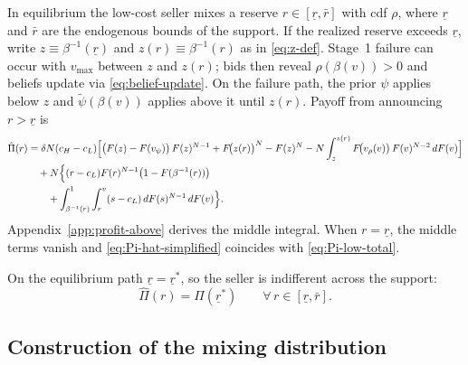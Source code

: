 In equilibrium the low-cost seller mixes a reserve
$r\in[\underline{r},\bar{r}]$ with cdf $\rho$, where $\underline{r}$ and
$\bar{r}$ are the endogenous bounds of the support.
If the realized reserve exceeds $\underline{r}$, write
$z\equiv\beta^{-1}(\underline{r})$ and $z(r)\equiv\beta^{-1}(r)$ as in
\eqref{eq:z-def}.
Stage~1 failure can occur with $v_{\max}$ between $z$ and $z(r)$; bids then
reveal $\rho(\beta(v))>0$ and beliefs update via \eqref{eq:belief-update}.
On the failure path, the prior $\psi$ applies below $z$ and
$\tilde{\psi}(\beta(v))$ applies above it until $z(r)$.
Payoff from announcing $r>\underline{r}$ is
\begin{align}
  \hat{\Pi}(r)
  &= \delta N (c_H - c_L)
    \Bigl[
      \bigl(F(z) - F(v_{\psi})\bigr)\, F(z)^{N-1}
      + F\!\bigl(z(r)\bigr)^{N}
      - F(z)^{N}
      - N \int_{z}^{z(r)}
        F\!\bigl(v_{\rho}(v)\bigr)\, F(v)^{N-2}\, dF(v)
    \Bigr]
  \notag \\
  &\quad + N \Bigl\{
    (r - c_L) F(r)^{N-1}
      \bigl(1 - F(\beta^{-1}(r))\bigr)
    \notag \\
  &\qquad + \int_{\beta^{-1}(r)}^{1}
      \int_{r}^{v} (s - c_L)\, dF(s)^{N-1}
      \, dF(v)
  \Bigr\}.
  \label{eq:Pi-hat-simplified}
\end{align}
Appendix~\ref{app:profit-above} derives the middle integral.
When $r=\underline{r}$, the middle terms vanish and
\eqref{eq:Pi-hat-simplified} coincides with \eqref{eq:Pi-low-total}.

On the equilibrium path $\underline{r}=\underline{r}^{*}$, so the seller is
indifferent across the support:
\begin{equation}
  \hat{\Pi}(r) = \Pi(\underline{r}^{*})
  \qquad \forall\, r\in[\underline{r},\bar{r}].
  \label{eq:indifference-condition}
\end{equation}

\subsection{Construction of the mixing distribution}
\label{sec:mixed-eqm}

